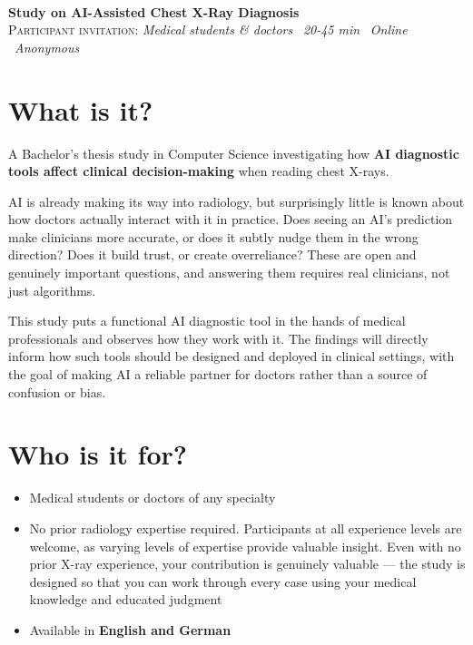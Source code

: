 \documentclass[10pt,a4paper]{article}
\begin{document}
\thispagestyle{empty}

\noindent{\color{accent}\rule{\linewidth}{2.5pt}}\\[0.45em]
{\LARGE\bfseries\color{accent}Study on AI-Assisted Chest X-Ray Diagnosis}\\[0.35em]
{\footnotesize\color{textmuted}\textsc{Participant invitation}: 
\textit{Medical students \& doctors} \textbullet\ 
\textit{20-45 min} \textbullet\ 
\textit{Online} \textbullet\ 
\textit{Anonymous}}

\vspace{0.85em}

\section{What is it?}

A Bachelor's thesis study in Computer Science investigating how \textbf{AI diagnostic tools affect clinical decision-making} when reading chest X-rays.

AI is already making its way into radiology, but surprisingly little is known about how doctors actually interact with it in practice. Does seeing an AI's prediction make clinicians more accurate, or does it subtly nudge them in the wrong direction? Does it build trust, or create overreliance? These are open and genuinely important questions, and answering them requires real clinicians, not just algorithms.

This study puts a functional AI diagnostic tool in the hands of medical professionals and observes how they work with it. The findings will directly inform how such tools should be designed and deployed in clinical settings, with the goal of making AI a reliable partner for doctors rather than a source of confusion or bias.

\section{Who is it for?}

\begin{itemize}
  \item Medical students or doctors of any specialty
  \item No prior radiology expertise required. Participants at all experience levels are welcome, as varying levels of expertise provide valuable insight. Even with no prior X-ray experience, your contribution is genuinely valuable --- the study is designed so that you can work through every case using your medical knowledge and educated judgment
  \item Available in \textbf{English and German}
\end{itemize}
\end{document}
